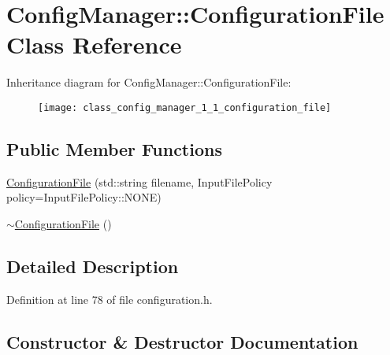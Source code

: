 \hypertarget{class_config_manager_1_1_configuration_file}{}\section{Config\+Manager\+:\+:Configuration\+File Class Reference}
\label{class_config_manager_1_1_configuration_file}
Inheritance diagram for Config\+Manager\+:\+:Configuration\+File\+:\begin{figure}[H]
\begin{center}
\leavevmode
\texttt{[image: class\_config\_manager\_1\_1\_configuration\_file]}
\end{center}
\end{figure}
\subsection*{Public Member Functions}
\begin{DoxyCompactItemize}
\item 
\hyperlink{class_config_manager_1_1_configuration_file_a07d5355e097215f22a31f8e3e1d73aae}{Configuration\+File} (std\+::string filename, Input\+File\+Policy policy=Input\+File\+Policy\+::\+N\+O\+NE)
\item 
\hyperlink{class_config_manager_1_1_configuration_file_ab58c1860cb0d3b502f674975000736a5}{$\sim$\+Configuration\+File} ()
\end{DoxyCompactItemize}


\subsection{Detailed Description}


Definition at line 78 of file configuration.\+h.



\subsection{Constructor \& Destructor Documentation}
